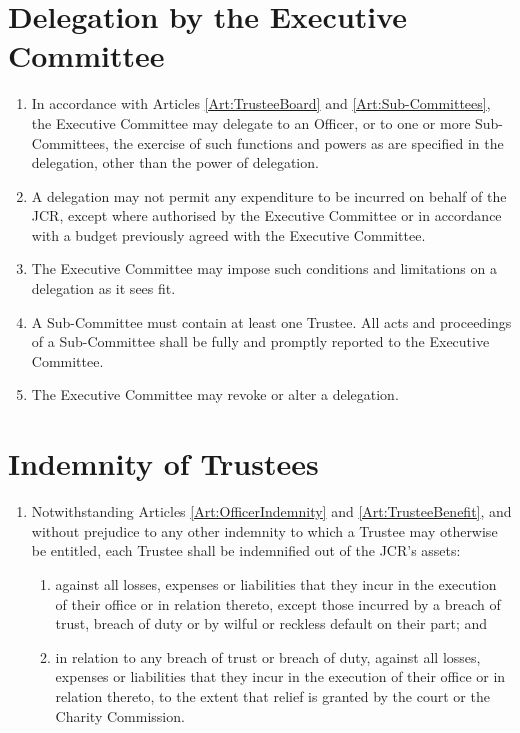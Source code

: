 \documentclass[11pt,a4paper, oneside]{memoir}
\begin{document}
	\section{Delegation by the Executive Committee} \label{Art:Delegation}
	\begin{enumerate}
		\item In accordance with Articles \ref{Art:TrusteeBoard} and \ref{Art:Sub-Committees}, the Executive Committee may delegate to an Officer, or to one or more Sub-Committees, the exercise of such functions and powers as are specified in the delegation, other than the power of delegation.
		\item A delegation may not permit any expenditure to be incurred on behalf of the JCR, except where authorised by the Executive Committee or in accordance with a budget previously agreed with the Executive Committee.
		\item The Executive Committee may impose such conditions and limitations on a delegation as it sees fit.
		\item A Sub-Committee must contain at least one Trustee.  All acts and proceedings of a Sub-Committee shall be fully and promptly reported to the Executive Committee.
		\item The Executive Committee may revoke or alter a delegation.
	\end{enumerate}
	\section{Indemnity of Trustees}
	\begin{enumerate}
		\item Notwithstanding Articles \ref{Art:OfficerIndemnity} and \ref{Art:TrusteeBenefit}, and without prejudice to any other indemnity to which a Trustee may otherwise be entitled, each Trustee shall be indemnified out of the JCR's assets:
		\begin{enumerate}
			\item against all losses, expenses or liabilities that they incur in the execution of their office or in relation thereto, except those incurred by a breach of trust, breach of duty or by wilful or reckless default on their part; and
			\item in relation to any breach of trust or breach of duty, against all losses, expenses or liabilities that they incur in the execution of their office or in relation thereto, to the extent that relief is granted by the court or the Charity Commission.
		\end{enumerate}
	\end{enumerate}
\end{document}

